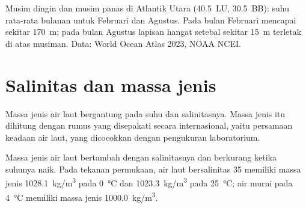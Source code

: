 \begin{omfigure}

{\small Musim dingin dan musim panas di Atlantik Utara (40.5\textdegree\ LU,
30.5\textdegree\ BB): suhu rata-rata bulanan untuk Februari dan Agustus. Pada
bulan Februari  mencapai sekitar \qty{170}{m}; pada bulan
Agustus lapisan hangat setebal sekitar \qty{15}{m} terletak di atas 
musiman. Data: World Ocean Atlas 2023, NOAA NCEI.}
\end{omfigure}

\section{Salinitas dan massa jenis}

Massa jenis air laut bergantung pada suhu dan salinitasnya. Massa jenis itu
dihitung dengan rumus yang disepakati secara internasional, yaitu persamaan
keadaan air laut, yang dicocokkan dengan pengukuran laboratorium.

\begin{proposition}\label{prop:g10:layered-ocean:density}
Massa jenis air laut bertambah dengan salinitasnya dan berkurang ketika suhunya
naik. Pada tekanan permukaan, air laut bersalinitas 35 memiliki massa jenis
\qty{1028.1}{kg/m^3} pada \qty{0}{\degreeCelsius} dan \qty{1023.3}{kg/m^3}
pada \qty{25}{\degreeCelsius}; air murni pada \qty{4}{\degreeCelsius} memiliki
massa jenis \qty{1000.0}{kg/m^3}.
\end{proposition}

